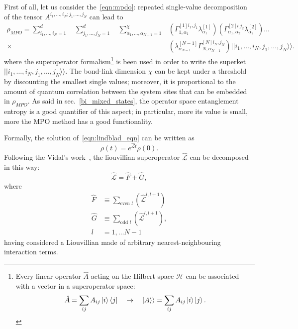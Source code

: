 First of all, let us consider the~\ref{eqn:mpdo}: repeated single-value decomposition of the tensor $A^{i_1,\dots, i_N; j_1,\dots, j_N}$ can lead to
\begin{equation*}
\label{mpo_ansatz}
\begin{split}
    \rho_{MPO} = \sum_{i_1, \dots ,i_N = 1}^{d}\quad \sum_{j_1, \dots ,j_N = 1}^{d}\quad \sum_{\alpha_1,\dots, \alpha_{N-1} = 1}^\chi &(\Gamma_{1, \alpha_1}^{[1]i_1, j_1}\lambda_{\alpha_1}^{[1]})(\Gamma_{\alpha_1, \alpha_2}^{[2]i_, j_2}\lambda_{\alpha_2}^{[2]}) \dots \\  \times &(\lambda_{\alpha_{N-1}}^{[N-1]}\Gamma_{N, \alpha_{N-1}}^{[N]i_N, j_N}) ||i_1, \dots ,i_N, j_1, \dots ,j_N\rangle\rangle.
    \end{split}
\end{equation*}
where the superoperator formalism\footnote{Every linear operator $\hat{A}$ acting on the Hilbert space $\mathcal{H}$ can be associated with a vector in a superoperator space:
\begin{equation*}
    \hat{A} = \sum_{ij} A_{ij} \ket{i}\bra{j} \quad \rightarrow \quad |A\rangle\rangle = \sum_{ij} A_{ij} \ket{i}\ket{j}.
\end{equation*}} is been used in order to write the superket \\$||i_1, \dots ,i_N, j_1, \dots ,j_N\rangle\rangle$. The bond-link dimension $\chi$ can be kept under a threshold by discounting the smallest single values; moreover, it is proportional to the amount of quantum correlation between the system sites that can be embedded in $\rho_{MPO}$. As said in sec.~\ref{bi_mixed_states}, the operator space entanglement entropy is a good quantifier of this aspect; in particular, more its value is small, more the MPO method has a good functionality.

Formally, the solution of~\ref{eqn:lindblad_eqn} can be written as
\begin{equation}
\label{eqn:lindblad_dinamics}
    \rho(t) = e^{\hat{\mathcal{L}}t}\rho(0).
\end{equation}
Following the Vidal's work~\cite{PhysRevLett.93.040502}, the liouvillian superoperator $\hat{\mathcal{L}}$ can be decomposed in this way:
\begin{equation}
    \hat{\mathcal{L}} = \hat{F} + \hat{G},
\end{equation}
where
\begin{equation}
    \begin{split}
        \hat{F} &\equiv \sum_{\text{even } l} (\hat{\mathcal{L}}^{l, l+1}) \\
        \hat{G} &\equiv \sum_{\text{odd } l} (\hat{\mathcal{L}}^{l, l+1}), \\
        l  &= 1, \dots N-1
    \end{split}
\end{equation}
having considered a Liouvillian made of arbitrary nearest-neighbouring interaction terms.

